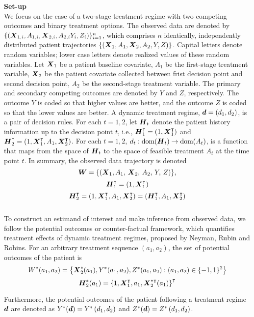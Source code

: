 \documentclass[../main.tex]{subfiles}
\begin{document}
\textbf{\large Set-up}\\
We focus on the case of a two-stage treatment regime with two competing outcomes and binary treatment options. The observed data are denoted by $\{(\boldsymbol{X}_{1,i}, A_{1,i},\boldsymbol{X}_{2,i}, A_{2,i} Y_{i},Z_{i})\}_{i=1}^{n}$, which comprises $n$ identically, independently distributed patient trajectories $\{(\boldsymbol{X}_{1}, A_{1},\boldsymbol{X}_{2}, A_{2}, Y,Z)\}$. Capital letters denote random variables; lower case letters denote realized values of these random variables. Let $\boldsymbol{X}_1$ be a patient baseline covariate, $A_1$ be the first-stage treatment variable, $\boldsymbol{X}_2$ be the patient covariate collected between frist decision point and second decision point, $A_2$ be the second-stage treatment variable. The primary and secondary competing outcomes are denoted by $Y$ and $Z$, respectively. The outcome $Y$ is coded so that higher values are better, and the outcome $Z$ is coded so that the lower values are better.  A dynamic treatment regime, $\boldsymbol{d} = (d_1, d_2)$, is a pair of decision rules. For each $t = 1, 2$, let $\boldsymbol{H}_t$ denote the patient history information up to the decision point $t$, i.e., $\boldsymbol{H}^\intercal_1 = (1, \boldsymbol{X}^\intercal_1)$ and  $\boldsymbol{H}^\intercal_2 = (1, \boldsymbol{X}^\intercal_1, A_1, \boldsymbol{X}^\intercal_2)$. For each $t = 1, 2$, $d_t : \text{dom}(\boldsymbol{H}_{t}) \to \text{dom}(A_t)$, is a function that maps from the space of $\boldsymbol{H}_{t}$ to the space of feasible treatment $A_t$ at the time point $t$. In summary, the observed data trajectory is denoted 
$$\boldsymbol{W}= \{(\boldsymbol{X}_{1}, A_{1}, \, \boldsymbol{X}_{2},  \, A_{2}, \,  Y, \, Z)\},$$
$$ \boldsymbol{H}_{1}^\intercal = (1,  \boldsymbol{X}_{1}^\intercal)$$
$$\boldsymbol{H}_2^\intercal = (1,  \boldsymbol{X}_1^\intercal,  A_1, \boldsymbol{X}_2^\intercal) = ( \boldsymbol{H}_1^\intercal, A_1, \boldsymbol{X}_2^\intercal )$$ \\

To construct an estimand of interest and make inference from observed data, we follow the potential outcomes or counter-factual framework, which quantifies treatment effects of dynamic treatment regimes, proposed by Neyman, Rubin and Robins. For an arbitrary treatment sequence $(a_1, a_2)$, the set of potential outcomes of the patient is
$$W^*(a_1, a_2) = \left\{ \boldsymbol{X}_2^*(a_1), Y^*(a_1, a_2), Z^*(a_1, a_2): (a_1, a_2) \in \{-1, 1 \}^2 \right\}$$
$$\boldsymbol{H}_2^*(a_1) = \left\{ 1, \boldsymbol{X}_1^\intercal, a_1, \boldsymbol{X}^{*\intercal}_2(a_1)\right\}^\intercal$$ 

Furthermore, the potential outcomes of the patient following a treatment regime $\boldsymbol{d}$ are denoted as $Y^{*}(\boldsymbol{d})=Y^{*}\left(d_1, d_2\right)$ and $Z^{*}(\boldsymbol{d})=Z^{*}\left(d_1, d_2\right)$.\\
\end{document}
